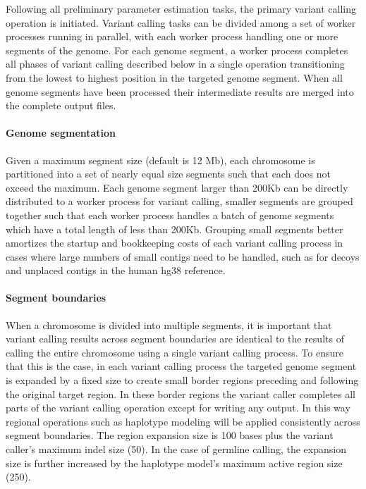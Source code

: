 \documentclass{article}
\begin{document}
Following all preliminary parameter estimation tasks, the primary variant calling operation is initiated. Variant calling tasks can be divided among a set of worker processes running in parallel, with each worker process handling one or more segments of the genome. For each genome segment, a worker process completes all phases of variant calling described below in a single operation transitioning from the lowest to highest position in the targeted genome segment. When all genome segments have been processed their intermediate results are merged into the complete output files.

\paragraph{Genome segmentation} Given a maximum segment size (default is 12 Mb), each chromosome is partitioned into a set of nearly equal size segments such that each does not exceed the maximum. Each genome segment larger than 200Kb can be directly distributed to a worker process for variant calling, smaller segments are grouped together such that each worker process handles a batch of genome segments which have a total length of less than 200Kb. Grouping small segments better amortizes the startup and bookkeeping costs of each variant calling process in cases where large numbers of small contigs need to be handled, such as for decoys and unplaced contigs in the human hg38 reference.

\paragraph{Segment boundaries} When a chromosome is divided into multiple segments, it is important that variant calling results across segment boundaries are identical to the results of calling the entire chromosome using a single variant calling process. To ensure that this is the case, in each variant calling process the targeted genome segment is expanded by a fixed size to create small border regions preceding and following the original target region. In these border regions the variant caller completes all parts of the variant calling operation except for writing any output. In this way regional operations such as haplotype modeling will be applied consistently across segment boundaries. The region expansion size is 100 bases plus the variant caller's maximum indel size (50). In the case of germline calling, the expansion size is further increased by the haplotype model's maximum active region size (250).
\end{document}
